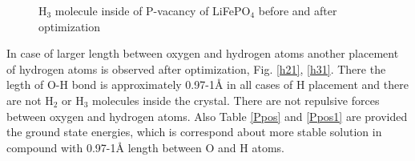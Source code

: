 \documentclass[11pt]{article}
\begin{document}
\begin{figure}[H]
\begin{minipage}[h]{0.48\linewidth}
\end{minipage}
\hfill
\begin{minipage}[h]{0.48\linewidth}
\end{minipage}
\caption{H$_3$ molecule inside of P-vacancy of LiFePO$_4$ before and after optimization}
\label{h3}
\end{figure}

In case of larger length between oxygen and hydrogen atoms another placement of hydrogen atoms is observed after optimization, Fig. \ref{h21}, \ref{h31}. There the legth of O-H bond is approximately 0.97-1\AA $ $ in all cases of H placement and there are not H$_2$ or H$_3$ molecules inside the crystal. There are not repulsive forces between oxygen and hydrogen atoms. Also Table \ref{Ppos} and \ref{Ppos1} are provided the ground state energies, which is correspond about more stable solution in compound with 0.97-1\AA$ $ length between O and H atoms.
\end{document}
